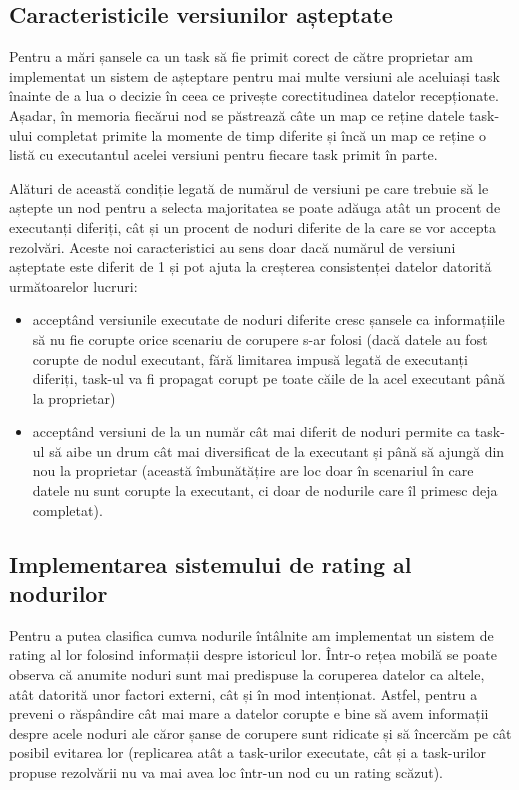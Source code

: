\documentclass[12pt,a4paper]{report}
\begin{document}
\subsection{Caracteristicile versiunilor așteptate} %

Pentru a mări șansele ca un task să fie primit corect de către proprietar am implementat un sistem de așteptare pentru mai multe versiuni ale aceluiași task înainte de a lua o decizie în ceea ce privește corectitudinea datelor recepționate. Așadar, în memoria fiecărui nod se păstrează câte un map ce reține datele task-ului completat primite la momente de timp diferite și încă un map ce reține o listă cu executantul acelei versiuni pentru fiecare task primit în parte. 

Alături de această condiție legată de numărul de versiuni pe care trebuie să le aștepte un nod pentru a selecta majoritatea se poate adăuga atât un procent de executanți diferiți, cât și un procent de noduri diferite de la care se vor accepta rezolvări. Aceste noi caracteristici au sens doar dacă numărul de versiuni așteptate este diferit de 1 și pot ajuta la creșterea consistenței datelor datorită următoarelor lucruri:
\begin{itemize}
	\item acceptând versiunile executate de noduri diferite cresc șansele ca informațiile să nu fie corupte orice scenariu de corupere s-ar folosi (dacă datele au fost corupte de nodul executant, fără limitarea impusă legată de executanți diferiți, task-ul va fi propagat corupt pe toate căile de la acel executant până la proprietar)
	\item acceptând versiuni de la un număr cât mai diferit de noduri permite ca task-ul să aibe un drum cât mai diversificat de la executant și până să ajungă din nou la proprietar (această îmbunătățire are loc doar în scenariul în care datele nu sunt corupte la executant, ci doar de nodurile care îl primesc deja completat).
\end{itemize}

\subsection{Implementarea sistemului de rating al nodurilor} \label{ratingSection}

Pentru a putea clasifica cumva nodurile întâlnite am implementat un sistem de rating al lor folosind informații despre istoricul lor. Într-o rețea mobilă se poate observa că anumite noduri sunt mai predispuse la coruperea datelor ca altele, atât datorită unor factori externi, cât și în mod intenționat. Astfel, pentru a preveni o răspândire cât mai mare a datelor corupte e bine să avem informații despre acele noduri ale căror șanse de corupere sunt ridicate și să încercăm pe cât posibil evitarea lor (replicarea atât a task-urilor executate, cât și a task-urilor propuse rezolvării nu va mai avea loc într-un nod cu un rating scăzut).
\end{document}

